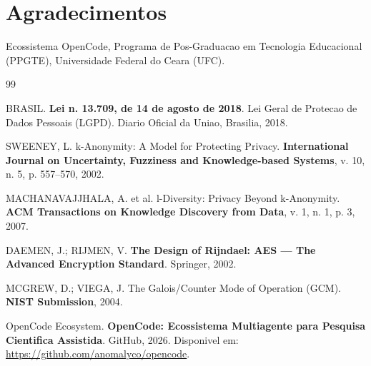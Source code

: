 \documentclass[5p]{elsarticle}
\begin{document}
\section*{Agradecimentos}
\label{sec:agradecimentos}

Ecossistema OpenCode, Programa de Pos-Graduacao em Tecnologia Educacional (PPGTE),
Universidade Federal do Ceara (UFC).

\begin{thebibliography}{99}

BRASIL. \textbf{Lei n. 13.709, de 14 de agosto de 2018}. Lei Geral de Protecao de Dados
Pessoais (LGPD). Diario Oficial da Uniao, Brasilia, 2018.

SWEENEY, L. k-Anonymity: A Model for Protecting Privacy.
\textbf{International Journal on Uncertainty, Fuzziness and Knowledge-based Systems},
v. 10, n. 5, p. 557--570, 2002.

MACHANAVAJJHALA, A. et al. l-Diversity: Privacy Beyond k-Anonymity.
\textbf{ACM Transactions on Knowledge Discovery from Data}, v. 1, n. 1, p. 3, 2007.

DAEMEN, J.; RIJMEN, V. \textbf{The Design of Rijndael: AES --- The Advanced Encryption
Standard}. Springer, 2002.

MCGREW, D.; VIEGA, J. The Galois/Counter Mode of Operation (GCM).
\textbf{NIST Submission}, 2004.

OpenCode Ecosystem. \textbf{OpenCode: Ecossistema Multiagente para Pesquisa Cientifica
Assistida}. GitHub, 2026. Disponivel em: \url{https://github.com/anomalyco/opencode}.

\end{thebibliography}
\end{document}
